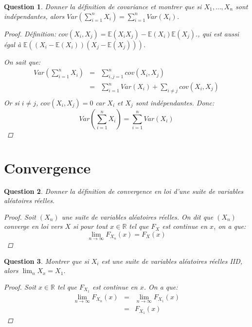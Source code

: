 \documentclass{article}
\theoremstyle{plain}
\newtheorem{question}{Question}
\begin{document}
\begin{question}
	Donner la définition de covariance et montrer que si $X_1, \dots, X_n$ sont indépendantes, alors $Var(\sum_{i=1}^n X_i) = \sum_{i=1}^n Var(X_i)$.
	\begin{proof}
		Définition: $cov(X_i, X_j) = \mathbb{E} (X_iX_j) - \mathbb{E} (X_i) \mathbb{E} (X_j)$., qui est aussi égal à $\mathbb{E} ((X_i - \mathbb{E} (X_i))(X_j - \mathbb{E} (X_j)))$.

		On sait que:
		\begin{eqnarray*}
			Var(\sum_{i=1}^n X_i) &=& \sum_{i,j=1}^n cov(X_i, X_j) \\
			&=& \sum_{i=1}^n Var(X_i) + \sum_{i \neq j} cov(X_i, X_j) \\
		\end{eqnarray*}
		Or si $i \neq j$, $cov(X_i, X_j) = 0$ car $X_i$ et $X_j$ sont indépendantes. Donc:
		\begin{equation*}
			Var(\sum_{i=1}^n X_i) = \sum_{i=1}^n Var(X_i)
		\end{equation*}

	\end{proof}
\end{question}

\section{Convergence}

\begin{question}
	Donner la définition de convergence en loi d'une suite de variables aléatoires réelles.
	\begin{proof}
		Soit $(X_n)$ une suite de variables aléatoires réelles. On dit que $(X_n)$ converge en loi vers $X$ si pour tout $x \in \mathbb{R}$ tel que $F_X$ est continue en $x$, on a que:
		\begin{equation*}
			\lim_{n \to \infty} F_{X_n} (x) = F_X (x)
		\end{equation*}
	\end{proof}

\end{question}

\begin{question}
	Montrer que si $X_i$ est une suite de variables aléatoires réelles IID, alors $\lim_n X_x = X_1$.
	\begin{proof}
		Soit $x \in \mathbb{R}$ tel que $F_{X_1}$ est continue en $x$. On a que:
		\begin{eqnarray*}
			\lim_{n \to \infty} F_{X_n} (x) &=& \lim_{n \to \infty} F_{X_1} (x) \\
			&=& F_{X_1} (x)
		\end{eqnarray*}
	\end{proof}
\end{question}
\end{document}
